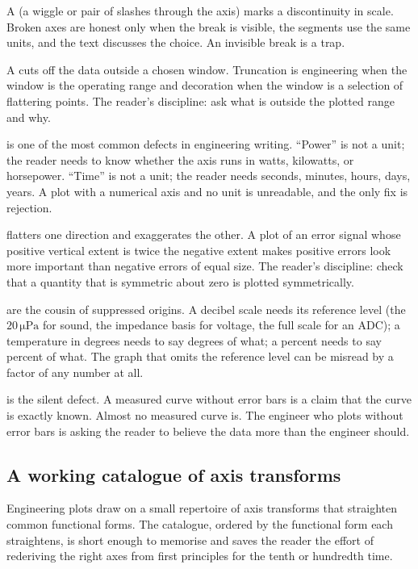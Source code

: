 A  (a wiggle or pair of slashes through the
axis) marks a discontinuity in scale. Broken axes are honest only
when the break is visible, the segments use the same units, and the
text discusses the choice. An invisible break is a trap.

A  cuts off the data outside a chosen
window. Truncation is engineering when the window is the operating
range and decoration when the window is a selection of flattering
points. The reader's discipline: ask what is outside the plotted
range and why.

 is one of the most common
defects in engineering writing. ``Power'' is not a unit; the reader
needs to know whether the axis runs in watts, kilowatts, or
horsepower. ``Time'' is not a unit; the reader needs seconds,
minutes, hours, days, years. A plot with a numerical axis and no unit
is unreadable, and the only fix is rejection.

 flatters one
direction and exaggerates the other. A plot of an error signal whose
positive vertical extent is twice the negative extent makes positive
errors look more important than negative errors of equal size. The
reader's discipline: check that a quantity that is symmetric about
zero is plotted symmetrically.

 are the cousin of suppressed
origins. A decibel scale needs its reference level (the $20\,\si
{\micro\pascal}$ for sound, the impedance basis for voltage, the full
scale for an ADC); a temperature in degrees needs to say degrees of
what; a percent needs to say percent of what. The graph that omits
the reference level can be misread by a factor of any number at all.

 is the silent defect. A measured curve
without error bars is a claim that the curve is exactly known. Almost
no measured curve is. The engineer who plots without error bars is
asking the reader to believe the data more than the engineer should.

\subsection{A working catalogue of axis transforms}

Engineering plots draw on a small repertoire of axis transforms
that straighten common functional forms. The catalogue, ordered by
the functional form each straightens, is short enough to memorise
and saves the reader the effort of rederiving the right axes from
first principles for the tenth or hundredth time.

